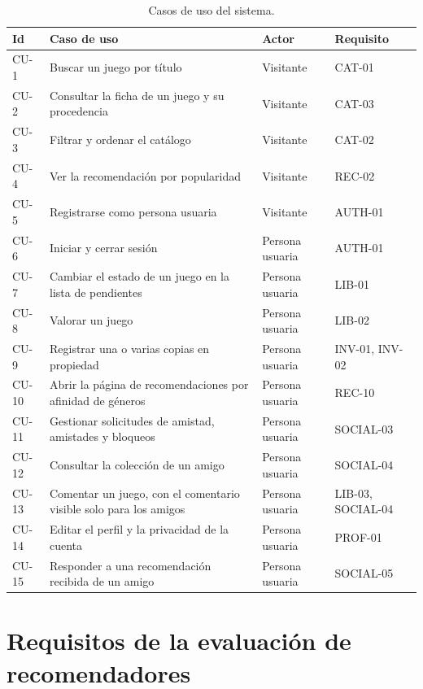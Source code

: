 \begin{table}[htp]
\centering
\begin{tabularx}{\textwidth}{ | C{0.10\textwidth} | Y | L{0.22\textwidth} | C{0.18\textwidth} | }
    \hline
    \textbf{Id} & \textbf{Caso de uso} & \textbf{Actor} & \textbf{Requisito} \\
    \hline
    CU-1 & Buscar un juego por título & Visitante & CAT-01 \\
    \hline
    CU-2 & Consultar la ficha de un juego y su procedencia & Visitante & CAT-03 \\
    \hline
    CU-3 & Filtrar y ordenar el catálogo & Visitante & CAT-02 \\
    \hline
    CU-4 & Ver la recomendación por popularidad & Visitante & REC-02 \\
    \hline
    CU-5 & Registrarse como persona usuaria & Visitante & AUTH-01 \\
    \hline
    CU-6 & Iniciar y cerrar sesión & Persona usuaria & AUTH-01 \\
    \hline
    CU-7 & Cambiar el estado de un juego en la lista de pendientes & Persona usuaria & LIB-01 \\
    \hline
    CU-8 & Valorar un juego & Persona usuaria & LIB-02 \\
    \hline
    CU-9 & Registrar una o varias copias en propiedad & Persona usuaria & INV-01, INV-02 \\
    \hline
    CU-10 & Abrir la página de recomendaciones por afinidad de géneros & Persona usuaria & REC-10 \\
    \hline
    CU-11 & Gestionar solicitudes de amistad, amistades y bloqueos & Persona usuaria & SOCIAL-03 \\
    \hline
    CU-12 & Consultar la colección de un amigo & Persona usuaria & SOCIAL-04 \\
    \hline
    CU-13 & Comentar un juego, con el comentario visible solo para los amigos & Persona usuaria & LIB-03, SOCIAL-04 \\
    \hline
    CU-14 & Editar el perfil y la privacidad de la cuenta & Persona usuaria & PROF-01 \\
    \hline
    CU-15 & Responder a una recomendación recibida de un amigo & Persona usuaria & SOCIAL-05 \\
    \hline
\end{tabularx}
\caption{Casos de uso del sistema.}
\label{tab:casos-uso}
\end{table}

\section{Requisitos de la evaluación de recomendadores}\label{sec:req-estudio}

